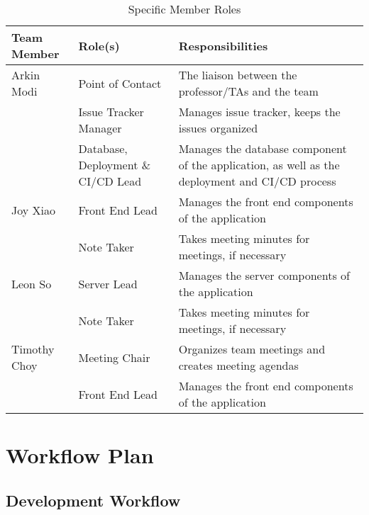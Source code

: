 \documentclass{article}
\begin{document}
\begin{table}[H]
	\centering
	\caption{Specific Member Roles}
	\vspace{5pt}
	\begin{tabular}{|p{}|p{}|p{}|}
		\hline
		\textbf{Team Member} & \textbf{Role(s)} & \textbf{Responsibilities} \\ 
		\hline
		Arkin Modi & Point of Contact & The liaison between the professor/TAs 
		and the team \\
		\cline{2-3}
		& Issue Tracker Manager & Manages issue tracker, keeps the issues 
		organized\\
		\cline{2-3}
		& Database, Deployment \& CI/CD Lead & Manages the database component of the application, as 
		well as the deployment and CI/CD process \\
		\hline
		Joy Xiao & Front End Lead & Manages the front end components of the application \\
		\cline{2-3}
		& Note Taker & Takes meeting minutes for meetings, if necessary \\
		\hline
		Leon So & Server Lead & Manages the server components of the application \\
		\cline{2-3}
		& Note Taker & Takes meeting minutes for meetings, if necessary \\
		\hline
		Timothy Choy & Meeting Chair & Organizes team meetings and creates meeting agendas \\
		\cline{2-3}
		& Front End Lead & Manages the front end components of the application \\
		\hline
	\end{tabular}
\end{table}

\section{Workflow Plan}


\subsection{Development Workflow}
\end{document}
